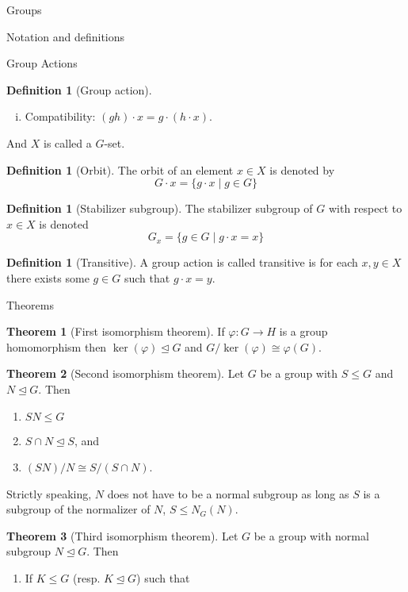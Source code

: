 \documentclass{article}
\theoremstyle{definition}
\newtheorem{theorem}{Theorem}
\numberwithin{theorem}{subsection} %
\theoremstyle{remark}
\theoremstyle{definition}
\newtheorem{definition}[paragraph]{Definition}
\newcommand{\set}[1]{\{#1\}}
\begin{document}
\begin{section}{Groups}
\begin{subsection}{Notation and definitions}
\begin{subsubsection}{Group Actions}
\begin{definition}[Group action]
\begin{enumerate}[(i)]
          $x \in X$: $1 \cdot x = x$.
          \item Compatibility: $(gh) \cdot x = g \cdot (h \cdot x)$.
        \end{enumerate}
        And $X$ is called a $G$-set.
      \end{definition}
      \begin{definition}[Orbit]
        The orbit of an element $x \in X$ is denoted by \[
          G \cdot x = \set{g \cdot x \mid g \in G}
        \]
      \end{definition}
      \begin{definition}[Stabilizer subgroup]
        The stabilizer subgroup of $G$ with respect to $x \in X$ is denoted \[
          G_x = \set{g \in G \mid g \cdot x = x}
        \]
      \end{definition}
      \begin{definition}[Transitive]
        A group action is called transitive is for each $x, y \in X$ there
        exists some $g \in G$ such that $g \cdot x = y$.
      \end{definition}
    \end{subsubsection}
  \end{subsection}
  \begin{subsection}{Theorems}
    \begin{theorem}[First isomorphism theorem]
      If $\varphi\colon G \rightarrow H$ is a group homomorphism then
      $\ker(\varphi) \trianglelefteq G$ and $G/\ker(\varphi) \cong \varphi(G)$.
    \end{theorem}
    \begin{theorem}[Second isomorphism theorem]
      Let $G$ be a group with $S \leq G$ and $N \trianglelefteq G$. Then
      \begin{enumerate}
        \item $SN \leq G$
        \item $S \cap N \trianglelefteq S$, and
        \item $(SN)/N \cong S/(S \cap N)$.
      \end{enumerate}
    \end{theorem}
    Strictly speaking, $N$ does not have to be a normal subgroup as long as $S$
    is a subgroup of the normalizer of $N$, $S \leq N_G(N)$.
    \begin{theorem}[Third isomorphism theorem]
      Let $G$ be a group with normal subgroup $N \trianglelefteq G$. Then
      \begin{enumerate}
        \item If $K \leq G$ (resp. $K \trianglelefteq G$) such that

\end{enumerate}
\end{theorem}
\end{subsection}
\end{section}
\end{document}

